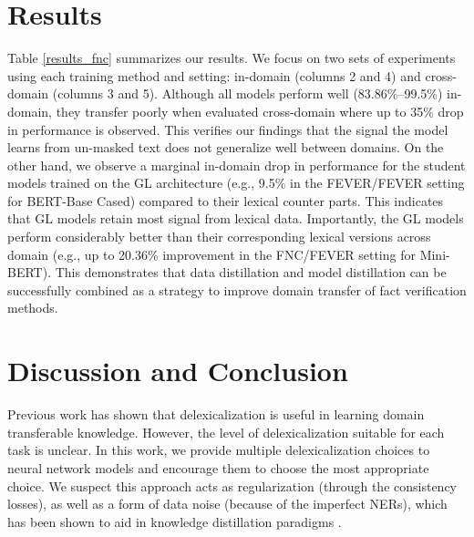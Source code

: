 \section{Results}
Table \ref{results_fnc} summarizes our results. We focus on two sets of experiments using each training method and setting: in-domain (columns 2 and 4) and cross-domain (columns 3 and 5).
Although all models perform well (83.86\%--99.5\%) in-domain, they transfer poorly when evaluated cross-domain where up to 35\% drop in performance is observed. This verifies our findings that the signal the model learns from un-masked text does not generalize well between domains.
On the other hand, we observe a marginal in-domain drop in performance for the student models trained on the GL architecture (e.g., 9.5\% in the FEVER/FEVER setting for BERT-Base Cased) compared to their lexical counter parts. This indicates that GL models retain most signal from lexical data. Importantly, the GL models perform considerably better than their corresponding lexical versions across domain (e.g., up to 20.36\% improvement in the FNC/FEVER setting for Mini-BERT). This demonstrates that data distillation and model distillation can be successfully combined as a strategy to improve domain transfer of fact verification methods.


\section{Discussion and Conclusion}
Previous work has shown that delexicalization is useful in learning domain transferable knowledge. However, the level of delexicalization suitable for each task is unclear. In this work, we provide multiple delexicalization choices to neural network models and encourage them to choose the most appropriate choice.
We suspect this approach acts as regularization (through the consistency losses), as well as a form of data noise (because of the imperfect NERs), which has been shown to aid in knowledge distillation paradigms \citep{hinton2015distilling,tarvainen2017mean}.

